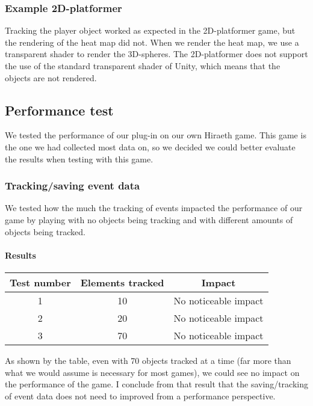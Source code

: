 
\subsubsection{Example 2D-platformer}
\label{Test_TG_2D}
Tracking the player object worked as expected in the 2D-platformer game, but the rendering of the heat map did not. When we render the heat map, we use a transparent shader to render the 3D-spheres. The 2D-platformer does not support the use of the standard transparent shader of Unity, which means that the objects are not rendered.

\subsection{Performance test}
\label{Test_P}
We tested the performance of our plug-in on our own Hiraeth game. This game is the one we had collected most data on, so we decided we could better evaluate the results when testing with this game.

\subsubsection{Tracking/saving event data}
\label{Test_P_Saving}
We tested how the much the tracking of events impacted the performance of our game by playing with no objects being tracking and with different amounts of objects being tracked.

\paragraph{Results}
\begin{center}
\begin{tabular}{| c | c | c |}
\hline
Test number & Elements tracked & Impact \\ 
\hline
1 & 10 & No noticeable impact \\ 
\hline
2 & 20 & No noticeable impact \\ 
\hline
3 & 70 & No noticeable impact \\
\hline
\end{tabular}
\end{center}

As shown by the table, even with 70 objects tracked at a time (far more than what we would assume is necessary for most games), we could see no impact on the performance of the game. I conclude from that result that the saving/tracking of event data does not need to improved from a performance perspective.

